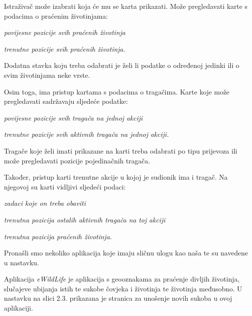		Istraživač može izabrati koja će mu se karta prikazati. Može pregledavati karte s podacima o praćenim životinjama:
		\begin{packed_item}
			\item \textit{povijesne pozicije svih praćenih životinja }
			\item \textit{trenutne pozicije svih praćenih životinja.}
		\end{packed_item}
		
		Dodatna stavka koju treba odabrati je želi li podatke o određenoj jedinki ili o svim životinjama neke vrste. 
		
		Osim toga, ima pristup kartama s podacima o tragačima. Karte koje može pregledavati sadržavaju sljedeće podatke:
		\begin{packed_item}
			\item \textit{povijesne pozicije svih tragača na jednoj akciji}
			\item \textit{trenutne pozicije svih aktivnih tragača na jednoj akciji.}
		\end{packed_item}
		
		Tragače koje želi imati prikazane na karti treba odabrati po tipu prijevoza ili može pregledavati pozicije pojedinačnih tragača.
		
		Također, pristup karti trenutne akcije u kojoj je sudionik ima i tragač.
		Na njegovoj su karti vidljivi sljedeći podaci:
		\begin{packed_item}
			\item \textit{zadaci koje on treba obaviti}
			\item \textit{trenutna pozicija ostalih aktivnih tragača na toj akciji}
			\item \textit{trenutna pozicija praćenih životinja.}
		\end{packed_item}
		
		Pronašli smo nekoliko aplikacija koje imaju sličnu ulogu kao naša te su navedene u nastavku.
		
		Aplikacija \textit{eWildLife} je aplikacija s geooznakama za praćenje divljih životinja, slučajeve ubijanja istih te sukobe čovjeka i životinja te životinja međusobno. U nastavku na slici 2.3. prikazana je stranica za unošenje novih sukoba u ovoj aplikaciji.
		
